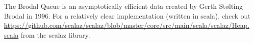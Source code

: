 The Brodal Queue is an asymptotically efficient data created by Gerth Stølting Brodal in 1996\cite{Brodal}.  For a relatively clear implementation (written in scala), check out \hyperref[this implementation]{https://github.com/scalaz/scalaz/blob/master/core/src/main/scala/scalaz/Heap.scala} from the scalaz library.
